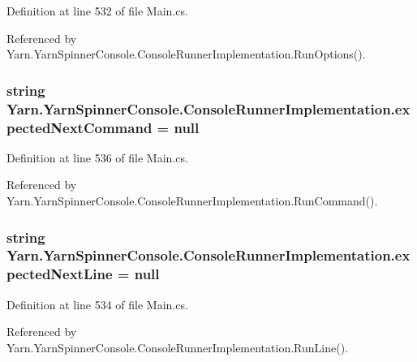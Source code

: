 Definition at line 532 of file Main.\-cs.



Referenced by Yarn.\-Yarn\-Spinner\-Console.\-Console\-Runner\-Implementation.\-Run\-Options().

\hypertarget{a00058_a3c7133c65dc7cf293f49b61426a0c4aa}{
\subsubsection[{expected\-Next\-Command}]{\setlength{\rightskip}{0pt plus 5cm}string Yarn.\-Yarn\-Spinner\-Console.\-Console\-Runner\-Implementation.\-expected\-Next\-Command = null}}\label{a00058_a3c7133c65dc7cf293f49b61426a0c4aa}


Definition at line 536 of file Main.\-cs.



Referenced by Yarn.\-Yarn\-Spinner\-Console.\-Console\-Runner\-Implementation.\-Run\-Command().

\hypertarget{a00058_a33a44e39f2d90850cee234dfad50f2c5}{
\subsubsection[{expected\-Next\-Line}]{\setlength{\rightskip}{0pt plus 5cm}string Yarn.\-Yarn\-Spinner\-Console.\-Console\-Runner\-Implementation.\-expected\-Next\-Line = null}}\label{a00058_a33a44e39f2d90850cee234dfad50f2c5}


Definition at line 534 of file Main.\-cs.



Referenced by Yarn.\-Yarn\-Spinner\-Console.\-Console\-Runner\-Implementation.\-Run\-Line().

